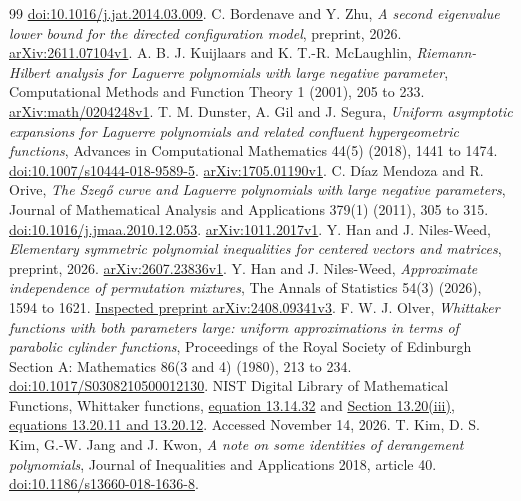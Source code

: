 \documentclass[11pt]{article}
\theoremstyle{definition}
\theoremstyle{remark}
\newcommand{\1}{\mathbf 1}
\begin{document}
\begin{thebibliography}{99}
\href{https://doi.org/10.1016/j.jat.2014.03.009}{doi:10.1016/j.jat.2014.03.009}.
C. Bordenave and Y. Zhu, \emph{A second eigenvalue lower bound for the directed configuration model}, preprint, 2026.
\href{https://arxiv.org/abs/2611.07104v1}{arXiv:2611.07104v1}.
A. B. J. Kuijlaars and K. T.-R. McLaughlin, \emph{Riemann-Hilbert analysis for Laguerre polynomials with large negative parameter}, Computational Methods and Function Theory 1 (2001), 205 to 233.
\href{https://arxiv.org/abs/math/0204248v1}{arXiv:math/0204248v1}.
T. M. Dunster, A. Gil and J. Segura, \emph{Uniform asymptotic expansions for Laguerre polynomials and related confluent hypergeometric functions}, Advances in Computational Mathematics 44(5) (2018), 1441 to 1474.
\href{https://doi.org/10.1007/s10444-018-9589-5}{doi:10.1007/s10444-018-9589-5}.
\href{https://arxiv.org/abs/1705.01190v1}{arXiv:1705.01190v1}.
C. D\'iaz Mendoza and R. Orive, \emph{The Szeg\H{o} curve and Laguerre polynomials with large negative parameters}, Journal of Mathematical Analysis and Applications 379(1) (2011), 305 to 315.
\href{https://doi.org/10.1016/j.jmaa.2010.12.053}{doi:10.1016/j.jmaa.2010.12.053}.
\href{https://arxiv.org/abs/1011.2017v1}{arXiv:1011.2017v1}.
Y. Han and J. Niles-Weed, \emph{Elementary symmetric polynomial inequalities for centered vectors and matrices}, preprint, 2026.
\href{https://arxiv.org/abs/2607.23836v1}{arXiv:2607.23836v1}.
Y. Han and J. Niles-Weed, \emph{Approximate independence of permutation mixtures}, The Annals of Statistics 54(3) (2026), 1594 to 1621.
\href{https://arxiv.org/abs/2408.09341v3}{Inspected preprint arXiv:2408.09341v3}.
F. W. J. Olver, \emph{Whittaker functions with both parameters large: uniform approximations in terms of parabolic cylinder functions}, Proceedings of the Royal Society of Edinburgh Section A: Mathematics 86(3 and 4) (1980), 213 to 234.
\href{https://doi.org/10.1017/S0308210500012130}{doi:10.1017/S0308210500012130}.
NIST Digital Library of Mathematical Functions, Whittaker functions,
\href{https://dlmf.nist.gov/13.14.E32}{equation 13.14.32} and
\href{https://dlmf.nist.gov/13.20.iii}{Section 13.20(iii), equations 13.20.11 and 13.20.12}.
Accessed November 14, 2026.
T. Kim, D. S. Kim, G.-W. Jang and J. Kwon, \emph{A note on some identities of derangement polynomials}, Journal of Inequalities and Applications 2018, article 40.
\href{https://doi.org/10.1186/s13660-018-1636-8}{doi:10.1186/s13660-018-1636-8}.


\end{thebibliography}
\end{document}
